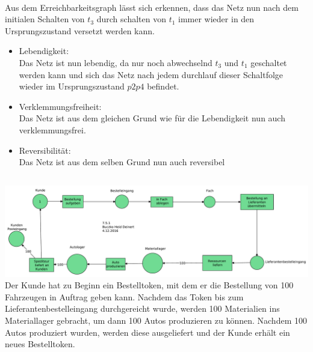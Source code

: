 \documentclass[a4paper,12pt]{scrartcl}
\begin{document}
\\
Aus dem Erreichbarkeitsgraph lässt sich erkennen, dass
das Netz nun nach dem initialen Schalten von $t_3$ durch 
schalten von $t_1$ immer wieder in den Ursprungszustand 
versetzt werden kann.
\begin{itemize}
  \item{Lebendigkeit:}\\
    Das Netz ist nun lebendig, da nur noch abwechselnd $t_3$ und $t_1$ geschaltet werden kann und sich das Netz nach jedem durchlauf dieser Schaltfolge wieder im Ursprungszustand $p2p4$ befindet.  
  \item{Verklemmungsfreiheit:}\\
    Das Netz ist aus dem gleichen Grund wie für die 
    Lebendigkeit nun auch verklemmungsfrei.
  \item{Reversibilität:}\\
    Das Netz ist aus dem selben Grund nun auch 
    reversibel

\end{itemize}
\subsection{}
\subsection{}
\subsubsection{}
\includegraphics[scale=0.4]{G-6-A-07-Netz2-Buczko_Heid_Deinert.pdf}\\
Der Kunde hat zu Beginn ein Bestelltoken, mit dem er 
die Bestellung von 100 Fahrzeugen in Auftrag geben 
kann. Nachdem das Token bis zum Lieferantenbestelleingang durchgereicht wurde,
werden 100 Materialien ins Materiallager gebracht,
um dann 100 Autos produzieren zu können.
Nachdem 100 Autos produziert wurden, werden diese ausgeliefert
und der Kunde erhält ein neues Bestelltoken.
\end{document}
